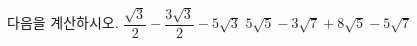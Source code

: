 다음을 계산하시오.
 $\dfrac{\sqrt{3}}{2}-\dfrac{3\sqrt{3}}{2}-5\sqrt{3}$
 $5\sqrt{5}-3\sqrt{7}+8\sqrt{5}-5\sqrt{7}$
